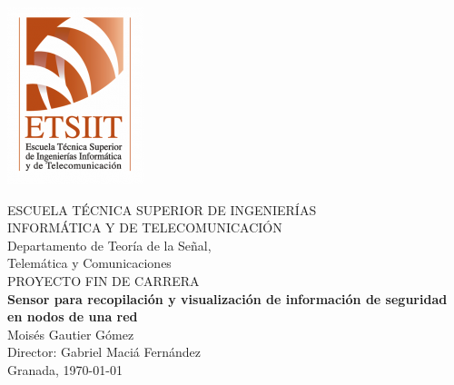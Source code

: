 \pagestyle{empty}
\begin{titlepage}

  \begin{center}

    \includegraphics[scale=.4]{logo_ugr.png} \\

    \vspace{2.0cm}

    \large{ESCUELA TÉCNICA SUPERIOR DE INGENIERÍAS \\ INFORMÁTICA Y DE TELECOMUNICACIÓN} \\
    \vspace{.5cm}
    \large{Departamento de Teoría de la Señal,\\ Telemática y Comunicaciones}\\
    \vspace{2.5cm}
    \large{PROYECTO FIN DE CARRERA}\\
    \vspace{.5cm}
    \Large{\textbf{Sensor para recopilación y visualización de información de seguridad en nodos de una red}} \\
    \vspace{3.0cm}
    \normalsize{Moisés Gautier Gómez\\
    Director: Gabriel Maciá Fernández\\}
    \vspace{1.5cm}
    Granada, \today

  \end{center}
\end{titlepage}
